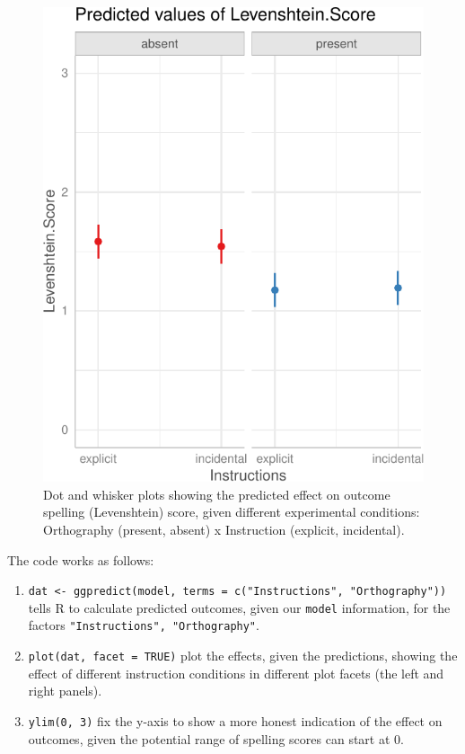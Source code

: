 \documentclass[
  letterpaper,
  DIV=11,
  numbers=noendperiod]{scrreprt}
\providecommand{\tightlist}{%
  \setlength{\itemsep}{0pt}\setlength{\parskip}{0pt}}\usepackage{longtable,booktabs,array}
\begin{document}
\begin{figure}[H]

{\centering \includegraphics{visualization_files/figure-pdf/fig-effects-dotwhisker-1.pdf}

}

\caption{\label{fig-effects-dotwhisker}Dot and whisker plots showing the
predicted effect on outcome spelling (Levenshtein) score, given
different experimental conditions: Orthography (present, absent) x
Instruction (explicit, incidental).}

\end{figure}

The code works as follows:

\begin{enumerate}
\def\labelenumi{\arabic{enumi}.}
\tightlist
\item
  \texttt{dat\ \textless{}-\ ggpredict(model,\ terms\ =\ c("Instructions",\ "Orthography"))}
  tells R to calculate predicted outcomes, given our \texttt{model}
  information, for the factors \texttt{"Instructions",\ "Orthography"}.
\item
  \texttt{plot(dat,\ facet\ =\ TRUE)} plot the effects, given the
  predictions, showing the effect of different instruction conditions in
  different plot facets (the left and right panels).
\item
  \texttt{ylim(0,\ 3)} fix the y-axis to show a more honest indication
  of the effect on outcomes, given the potential range of spelling
  scores can start at 0.
\end{enumerate}
\end{document}
